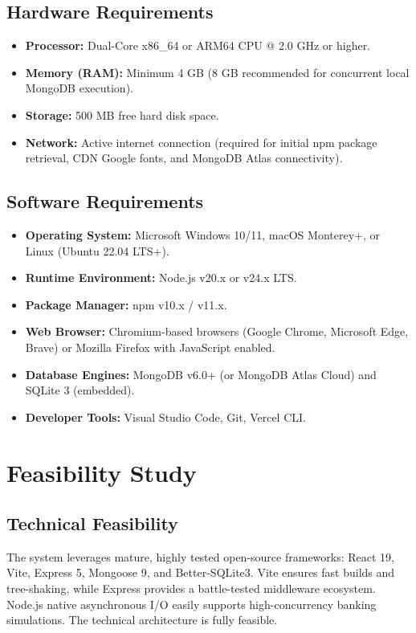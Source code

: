 \subsection{Hardware Requirements}
\begin{itemize}
    \item \textbf{Processor:} Dual-Core x86\_64 or ARM64 CPU @ 2.0 GHz or higher.
    \item \textbf{Memory (RAM):} Minimum 4 GB (8 GB recommended for concurrent local MongoDB execution).
    \item \textbf{Storage:} 500 MB free hard disk space.
    \item \textbf{Network:} Active internet connection (required for initial npm package retrieval, CDN Google fonts, and MongoDB Atlas connectivity).
\end{itemize}

\subsection{Software Requirements}
\begin{itemize}
    \item \textbf{Operating System:} Microsoft Windows 10/11, macOS Monterey+, or Linux (Ubuntu 22.04 LTS+).
    \item \textbf{Runtime Environment:} Node.js v20.x or v24.x LTS.
    \item \textbf{Package Manager:} npm v10.x / v11.x.
    \item \textbf{Web Browser:} Chromium-based browsers (Google Chrome, Microsoft Edge, Brave) or Mozilla Firefox with JavaScript enabled.
    \item \textbf{Database Engines:} MongoDB v6.0+ (or MongoDB Atlas Cloud) and SQLite 3 (embedded).
    \item \textbf{Developer Tools:} Visual Studio Code, Git, Vercel CLI.
\end{itemize}

\section{Feasibility Study}

\subsection{Technical Feasibility}
The system leverages mature, highly tested open-source frameworks: React 19, Vite, Express 5, Mongoose 9, and Better-SQLite3. Vite ensures fast builds and tree-shaking, while Express provides a battle-tested middleware ecosystem. Node.js native asynchronous I/O easily supports high-concurrency banking simulations. The technical architecture is fully feasible.

